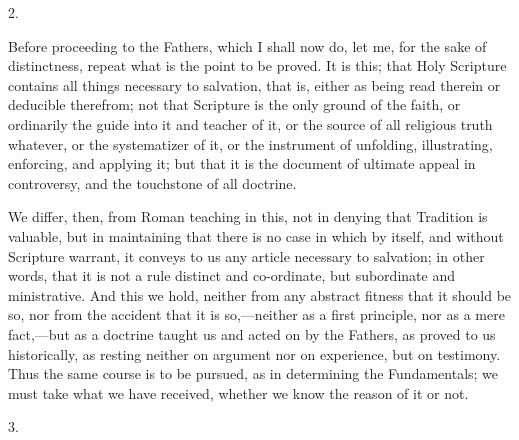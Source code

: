 2.

Before proceeding to the Fathers, which I shall now do, let me, for
the sake of distinctness, repeat what is the point to be proved. It is
this; that Holy Scripture contains all things necessary to salvation,
that is, either as being read therein or deducible therefrom; not that
Scripture is the only ground of the faith, or ordinarily the guide
into it and teacher of it, or the source of all religious truth
whatever, or the systematizer of it, or the instrument of unfolding,
illustrating, enforcing, and applying it; but that it is the document
of ultimate appeal in controversy, and the touchstone of all doctrine.

We differ, then, from Roman teaching in this, not in denying that
Tradition is valuable, but in maintaining that there is no case in
which by itself, and without Scripture warrant, it conveys to us any
article necessary to salvation; in other words, that it is not a rule
distinct and co-ordinate, but subordinate and ministrative. And this
we hold, neither from any abstract fitness that it should be so, nor
from the accident that it is so,—neither as a first principle, nor
as a mere fact,—but as a doctrine taught us and acted on by the
Fathers, as proved to us historically, as resting neither on argument
nor on experience, but on testimony. Thus the same course is to be
pursued, as in determining the Fundamentals; we must take what we have
received, whether we know the reason of it or not.

3.

